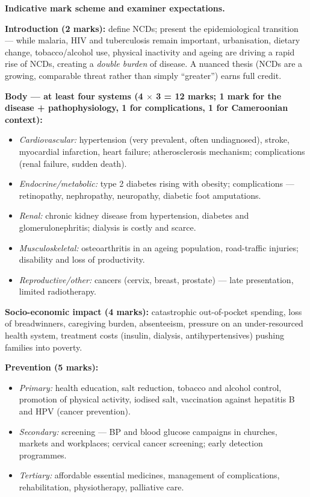 \documentclass[11pt]{article}
\begin{document}
\begin{corrige}
\textbf{Indicative mark scheme and examiner expectations.}

\textbf{Introduction (2 marks):} define NCDs; present the epidemiological transition — while malaria, HIV and tuberculosis remain important, urbanisation, dietary change, tobacco/alcohol use, physical inactivity and ageing are driving a rapid rise of NCDs, creating a \emph{double burden} of disease. A nuanced thesis (NCDs are a growing, comparable threat rather than simply ``greater'') earns full credit.

\textbf{Body — at least four systems (4 $\times$ 3 = 12 marks; 1 mark for the disease + pathophysiology, 1 for complications, 1 for Cameroonian context):}
\begin{itemize}
\item \emph{Cardiovascular:} hypertension (very prevalent, often undiagnosed), stroke, myocardial infarction, heart failure; atherosclerosis mechanism; complications (renal failure, sudden death).
\item \emph{Endocrine/metabolic:} type 2 diabetes rising with obesity; complications — retinopathy, nephropathy, neuropathy, diabetic foot amputations.
\item \emph{Renal:} chronic kidney disease from hypertension, diabetes and glomerulonephritis; dialysis is costly and scarce.
\item \emph{Musculoskeletal:} osteoarthritis in an ageing population, road-traffic injuries; disability and loss of productivity.
\item \emph{Reproductive/other:} cancers (cervix, breast, prostate) — late presentation, limited radiotherapy.
\end{itemize}

\textbf{Socio-economic impact (4 marks):} catastrophic out-of-pocket spending, loss of breadwinners, caregiving burden, absenteeism, pressure on an under-resourced health system, treatment costs (insulin, dialysis, antihypertensives) pushing families into poverty.

\textbf{Prevention (5 marks):}
\begin{itemize}
\item \emph{Primary:} health education, salt reduction, tobacco and alcohol control, promotion of physical activity, iodised salt, vaccination against hepatitis B and HPV (cancer prevention).
\item \emph{Secondary:} screening — BP and blood glucose campaigns in churches, markets and workplaces; cervical cancer screening; early detection programmes.
\item \emph{Tertiary:} affordable essential medicines, management of complications, rehabilitation, physiotherapy, palliative care.
\end{itemize}


\end{corrige}
\end{document}
